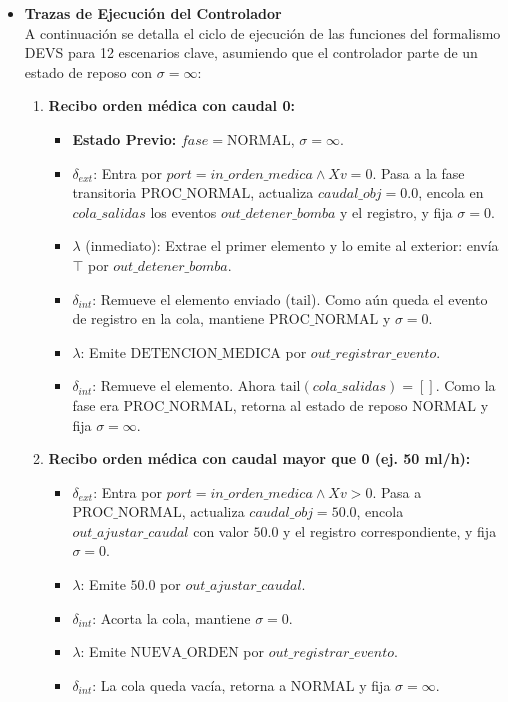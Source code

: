 \begin{itemize}
\item \textbf{Trazas de Ejecución del Controlador} \\
    A continuación se detalla el ciclo de ejecución de las funciones del formalismo DEVS para 12 escenarios clave, asumiendo que el controlador parte de un estado de reposo con $\sigma = \infty$:
    
    \begin{enumerate}
        \item \textbf{Recibo orden médica con caudal 0:}
        \begin{itemize}
            \item \textbf{Estado Previo:} $fase = \text{NORMAL}$, $\sigma = \infty$.
            \item $\delta_{ext}$: Entra por $port = in\_orden\_medica \land Xv = 0$. Pasa a la fase transitoria $\text{PROC\_NORMAL}$, actualiza $caudal\_obj = 0.0$, encola en $cola\_salidas$ los eventos $out\_detener\_bomba$ y el registro, y fija $\sigma = 0$.
            \item $\lambda$ (inmediato): Extrae el primer elemento y lo emite al exterior: envía $\top$ por $out\_detener\_bomba$.
            \item $\delta_{int}$: Remueve el elemento enviado ($\text{tail}$). Como aún queda el evento de registro en la cola, mantiene $\text{PROC\_NORMAL}$ y $\sigma = 0$.
            \item $\lambda$: Emite $\text{DETENCION\_MEDICA}$ por $out\_registrar\_evento$.
            \item $\delta_{int}$: Remueve el elemento. Ahora $\text{tail}(cola\_salidas) = [ ]$. Como la fase era $\text{PROC\_NORMAL}$, retorna al estado de reposo $\text{NORMAL}$ y fija $\sigma = \infty$.
        \end{itemize}

        \item \textbf{Recibo orden médica con caudal mayor que 0 (ej. 50 ml/h):}
        \begin{itemize}
            \item $\delta_{ext}$: Entra por $port = in\_orden\_medica \land Xv > 0$. Pasa a $\text{PROC\_NORMAL}$, actualiza $caudal\_obj = 50.0$, encola $out\_ajustar\_caudal$ con valor $50.0$ y el registro correspondiente, y fija $\sigma = 0$.
            \item $\lambda$: Emite $50.0$ por $out\_ajustar\_caudal$.
            \item $\delta_{int}$: Acorta la cola, mantiene $\sigma = 0$.
            \item $\lambda$: Emite $\text{NUEVA\_ORDEN}$ por $out\_registrar\_evento$.
            \item $\delta_{int}$: La cola queda vacía, retorna a $\text{NORMAL}$ y fija $\sigma = \infty$.
        \end{itemize}


\end{enumerate}
\end{itemize}
